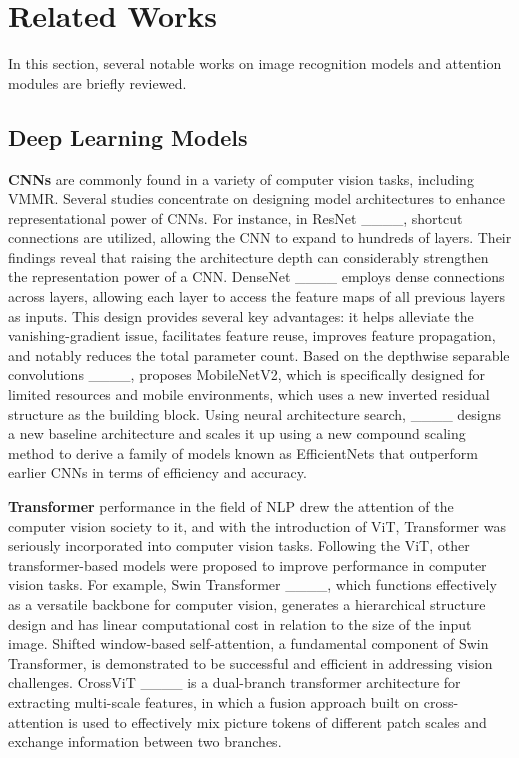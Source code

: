 \section{Related Works}
In this section, several notable works on image recognition models and attention modules are briefly reviewed.

\subsection{Deep Learning Models}
\textbf{CNNs} are commonly found in a variety of computer vision tasks, including VMMR. Several studies concentrate on designing model architectures to enhance representational power of CNNs. For instance, in ResNet ____, shortcut connections are utilized, allowing the CNN to expand to hundreds of layers. Their findings reveal that raising the architecture depth can considerably strengthen the representation power of a CNN. DenseNet ____ employs dense connections across layers, allowing each layer to access the feature maps of all previous layers as inputs. This design provides several key advantages: it helps alleviate the vanishing-gradient issue, facilitates feature reuse, improves feature propagation, and notably reduces the total parameter count. Based on the depthwise separable convolutions ____, proposes MobileNetV2, which is specifically designed for limited resources and mobile environments, which uses a new inverted residual structure as the building block. Using neural architecture search, ____ designs a new baseline architecture and scales it up using a new compound scaling method to derive a family of models known as EfficientNets that outperform earlier CNNs in terms of efficiency and accuracy.

\textbf{Transformer} performance in the field of NLP drew the attention of the computer vision society to it, and with the introduction of ViT, Transformer was seriously incorporated into computer vision tasks. Following the ViT, other transformer-based models were proposed to improve performance in computer vision tasks. For example, Swin Transformer ____, which functions effectively as a versatile backbone for computer vision, generates a hierarchical structure design and has linear computational cost in relation to the size of the input image. Shifted window-based self-attention, a fundamental component of Swin Transformer, is demonstrated to be successful and efficient in addressing vision challenges. CrossViT ____ is a dual-branch transformer architecture for extracting multi-scale features, in which a fusion approach built on cross-attention is used to effectively mix picture tokens of different patch scales and exchange information between two branches.

